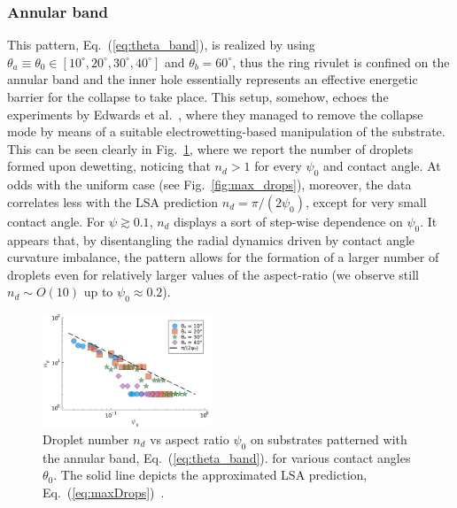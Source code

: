 \documentclass[twoside,twocolumn,9pt]{article}
\begin{document}
\subsubsection{Annular band}\label{subsubsec:banded}
This pattern, Eq.~(\ref{eq:theta_band}), is realized by using $\theta_a \equiv \theta_0 \in [10^{\circ}, 20^{\circ}, 30^{\circ}, 40^{\circ}]$ and $\theta_b = 60^{\circ}$, thus
the ring rivulet is confined on the annular band and the inner hole 
essentially represents an effective energetic barrier for the collapse to take place.
This setup, somehow, echoes the experiments by 
Edwards et al.~\cite{edwardsControllingBreakupToroidal2021}, where they managed to remove the collapse mode by means of a suitable electrowetting-based manipulation of the substrate.
This can be seen clearly in Fig.~\ref{fig:max_drops_band}, where we report the number of droplets formed upon 
dewetting, noticing that $n_d>1$ for every $\psi_0$ and contact angle. At odds with the uniform case 
(see Fig.~\ref{fig:max_drops}), moreover, the data correlates less with the LSA prediction $n_d = \pi/(2\psi_0)$, except for very small contact angle. For $\psi \gtrsim 0.1$, $n_d$ displays a sort of step-wise dependence on
$\psi_0$. It appears that, by disentangling the radial dynamics driven by contact angle curvature imbalance, the pattern allows for the formation of a larger number of droplets even for relatively larger values of the aspect-ratio (we observe still $n_d \sim O(10)$ up to $\psi_0 \approx 0.2$).
\begin{figure}
    \centering
    \includegraphics[width=0.45\textwidth]{assets/Ndrops_ban_new.pdf}    
    \caption{Droplet number $n_d$ vs aspect ratio $\psi_0$ on substrates patterned with 
    the annular band, Eq.~(\ref{eq:theta_band}).
    for various contact angles $\theta_0$. The solid line depicts the 
    approximated LSA prediction, Eq.~(\ref{eq:maxDrops})~\cite{gonzalezStabilityLiquidRing2013}.}
    \label{fig:max_drops_band}
\end{figure}
\end{document}
